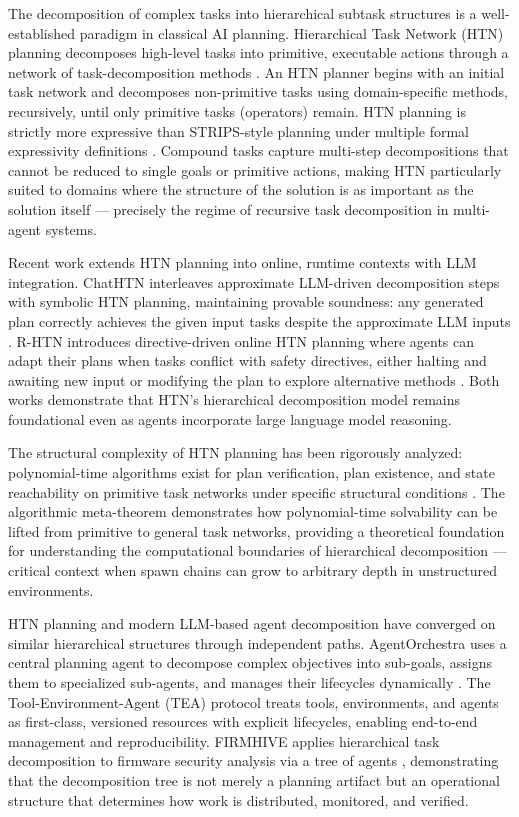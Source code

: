 The decomposition of complex tasks into hierarchical subtask structures is a well-established paradigm in classical AI planning. Hierarchical Task Network (HTN) planning decomposes high-level tasks into primitive, executable actions through a network of task-decomposition methods \cite{erol1994umcp,erol1996complexity,htn-survey2015}. An HTN planner begins with an initial task network and decomposes non-primitive tasks using domain-specific methods, recursively, until only primitive tasks (operators) remain. HTN planning is strictly more expressive than STRIPS-style planning under multiple formal expressivity definitions \cite{erol1994umcp}. Compound tasks capture multi-step decompositions that cannot be reduced to single goals or primitive actions, making HTN particularly suited to domains where the structure of the solution is as important as the solution itself — precisely the regime of recursive task decomposition in multi-agent systems.

Recent work extends HTN planning into online, runtime contexts with LLM integration. ChatHTN interleaves approximate LLM-driven decomposition steps with symbolic HTN planning, maintaining provable soundness: any generated plan correctly achieves the given input tasks despite the approximate LLM inputs \cite{chathtn2025}. R-HTN introduces directive-driven online HTN planning where agents can adapt their plans when tasks conflict with safety directives, either halting and awaiting new input or modifying the plan to explore alternative methods \cite{rhtn2025}. Both works demonstrate that HTN's hierarchical decomposition model remains foundational even as agents incorporate large language model reasoning.

The structural complexity of HTN planning has been rigorously analyzed: polynomial-time algorithms exist for plan verification, plan existence, and state reachability on primitive task networks under specific structural conditions \cite{htn-complexity2025}. The algorithmic meta-theorem demonstrates how polynomial-time solvability can be lifted from primitive to general task networks, providing a theoretical foundation for understanding the computational boundaries of hierarchical decomposition — critical context when spawn chains can grow to arbitrary depth in unstructured environments.

HTN planning and modern LLM-based agent decomposition have converged on similar hierarchical structures through independent paths. AgentOrchestra uses a central planning agent to decompose complex objectives into sub-goals, assigns them to specialized sub-agents, and manages their lifecycles dynamically \cite{agentorchestra2025}. The Tool-Environment-Agent (TEA) protocol treats tools, environments, and agents as first-class, versioned resources with explicit lifecycles, enabling end-to-end management and reproducibility. FIRMHIVE applies hierarchical task decomposition to firmware security analysis via a tree of agents \cite{firmhive2025}, demonstrating that the decomposition tree is not merely a planning artifact but an operational structure that determines how work is distributed, monitored, and verified.

